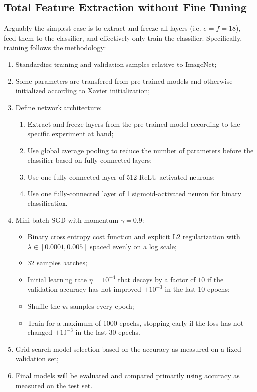 \subsection{Total Feature Extraction without Fine Tuning}

Arguably the simplest case is to extract and freeze all layers (i.e. $e = f = 18$), feed them to the classifier, and effectively only train the classifier. Specifically, training follows the methodology:

\begin{enumerate}
    \item Standardize training and validation samples relative to ImageNet;
    \item Some parameters are transfered from pre-trained models and otherwise initialized according to Xavier initialization;
    \item Define network architecture:
        \begin{enumerate}
            \item Extract and freeze layers from the pre-trained model according to the specific experiment at hand;
            \item Use global average pooling to reduce the number of parameters before the classifier based on fully-connected layers;
            \item Use one fully-connected layer of 512 ReLU-activated neurons;
            \item Use one fully-connected layer of 1 sigmoid-activated neuron for binary classification.
        \end{enumerate}
    \item Mini-batch \ac{SGD} with momentum $\gamma = 0.9$:
        \begin{itemize}
            \item Binary cross entropy cost function and explicit L2 regularization with $\lambda \in [0.0001, 0.005]$ spaced evenly on a log scale;
            \item 32 samples batches;
            \item Initial learning rate $\eta = 10^{-4}$ that decays by a factor of $10$ if the validation accuracy has not improved $+10^{-3}$ in the last $10$ epochs;
            \item Shuffle the $m$ samples every epoch;
            \item Train for a maximum of 1000 epochs, stopping early if the loss has not changed $\pm 10^{-3}$ in the last $30$ epochs.
        \end{itemize}
    \item Grid-search model selection based on the accuracy as measured on a fixed validation set;
    \item Final models will be evaluated and compared primarily using accuracy as measured on the test set.
\end{enumerate}

